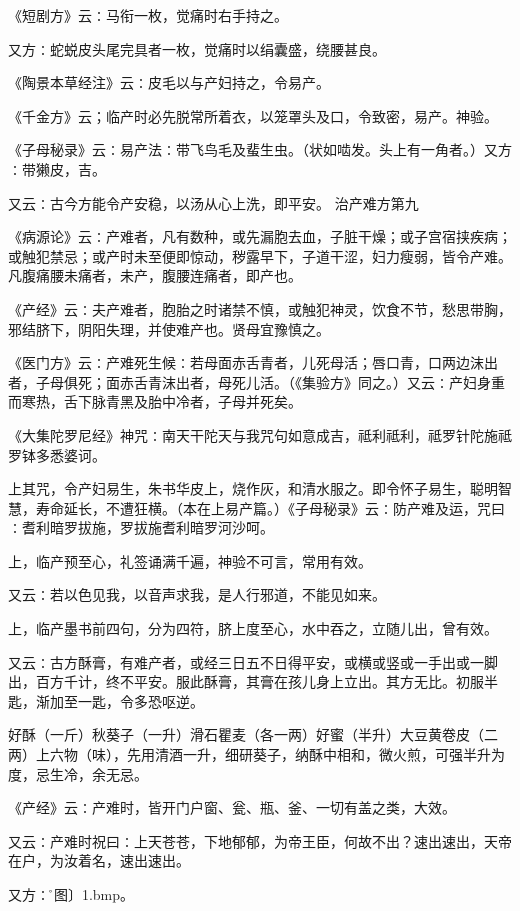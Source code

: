 \documentclass[a4paper,12pt,UTF8,twoside]{ctexbook}
\begin{document}
《短剧方》云∶马衔一枚，觉痛时右手持之。

又方∶蛇蜕皮头尾完具者一枚，觉痛时以绢囊盛，绕腰甚良。

《陶景本草经注》云∶皮毛以与产妇持之，令易产。

《千金方》云；临产时必先脱常所着衣，以笼罩头及口，令致密，易产。神验。

《子母秘录》云∶易产法∶带飞鸟毛及蜚生虫。（状如啮发。头上有一角者。）又方∶带獭皮，吉。

又云∶古今方能令产安稳，以汤从心上洗，即平安。
治产难方第九

《病源论》云∶产难者，凡有数种，或先漏胞去血，子脏干燥；或子宫宿挟疾病；或触犯禁忌；或产时未至便即惊动，秽露早下，子道干涩，妇力瘦弱，皆令产难。凡腹痛腰未痛者，未产，腹腰连痛者，即产也。

《产经》云∶夫产难者，胞胎之时诸禁不慎，或触犯神灵，饮食不节，愁思带胸，邪结脐下，阴阳失理，并使难产也。贤母宜豫慎之。

《医门方》云∶产难死生候∶若母面赤舌青者，儿死母活；唇口青，口两边沫出者，子母俱死；面赤舌青沫出者，母死儿活。（《集验方》同之。）又云∶产妇身重而寒热，舌下脉青黑及胎中冷者，子母并死矣。

《大集陀罗尼经》神咒∶南天干陀天与我咒句如意成吉，祗利祗利，祗罗针陀施祗罗钵多悉婆诃。

上其咒，令产妇易生，朱书华皮上，烧作灰，和清水服之。即令怀子易生，聪明智慧，寿命延长，不遭狂横。（本在上易产篇。）《子母秘录》云∶防产难及运，咒曰∶耆利暗罗拔施，罗拔施耆利暗罗河沙呵。

上，临产预至心，礼签诵满千遍，神验不可言，常用有效。

又云∶若以色见我，以音声求我，是人行邪道，不能见如来。

上，临产墨书前四句，分为四符，脐上度至心，水中吞之，立随儿出，曾有效。

又云∶古方酥膏，有难产者，或经三日五不日得平安，或横或竖或一手出或一脚出，百方千计，终不平安。服此酥膏，其膏在孩儿身上立出。其方无比。初服半匙，渐加至一匙，令多恐呕逆。

好酥（一斤）秋葵子（一升）滑石瞿麦（各一两）好蜜（半升）大豆黄卷皮（二两）上六物（味），先用清酒一升，细研葵子，纳酥中相和，微火煎，可强半升为度，忌生冷，余无忌。

《产经》云∶产难时，皆开门户窗、瓮、瓶、釜、一切有盖之类，大效。

又云∶产难时祝曰∶上天苍苍，下地郁郁，为帝王臣，何故不出？速出速出，天帝在户，为汝着名，速出速出。

又方∶\r〔图〕\pyxf1.bmp。
\end{document}
